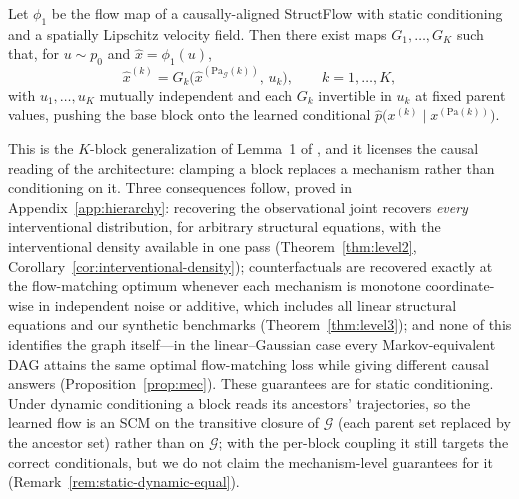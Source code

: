 \begin{lemma}
\label{lem:mech-main}
Let $\phi_1$ be the flow map of a causally-aligned StructFlow with static conditioning and a spatially Lipschitz velocity field. Then there exist maps $G_1,\dots,G_K$ such that, for $u \sim p_0$ and
$\hat x = \phi_1(u)$,
\begin{equation}
    \hat x^{(k)} = G_k\bigl(\hat x^{(\mathrm{Pa}_\mathcal{G}(k))},\, u_k\bigr),
    \qquad k = 1,\dots,K,
\end{equation}
with $u_1,\dots,u_K$ mutually independent and each $G_k$ invertible in $u_k$ at fixed parent values, pushing the base block onto the learned conditional $\hat p\bigl(x^{(k)} \mid x^{(\mathrm{Pa}(k))}\bigr)$.
\end{lemma}

This is the $K$-block generalization of Lemma~1 of \citet{jeong_conditional_2025}, and it
licenses the causal reading of the architecture: clamping a block replaces a mechanism rather than conditioning on it. Three consequences follow, proved in
Appendix~\ref{app:hierarchy}: recovering the observational joint recovers \emph{every}
interventional distribution, for arbitrary structural equations, with the interventional
density available in one pass (Theorem~\ref{thm:level2},
Corollary~\ref{cor:interventional-density}); counterfactuals are recovered exactly at the flow-matching optimum whenever each mechanism is monotone coordinate-wise in independent noise or additive, which includes all linear structural equations and our synthetic benchmarks (Theorem~\ref{thm:level3}); and none of this identifies the graph itself---in the linear--Gaussian case every Markov-equivalent DAG
attains the same optimal flow-matching loss while giving different causal answers
(Proposition~\ref{prop:mec}). These guarantees are for static conditioning. Under dynamic conditioning a block reads its ancestors' trajectories, so the learned flow is an SCM on the transitive closure of $\mathcal{G}$ (each parent set replaced by the ancestor set) rather than on $\mathcal{G}$; with the per-block coupling it still targets the correct conditionals, but we do not claim the mechanism-level guarantees for it (Remark~\ref{rem:static-dynamic-equal}).

